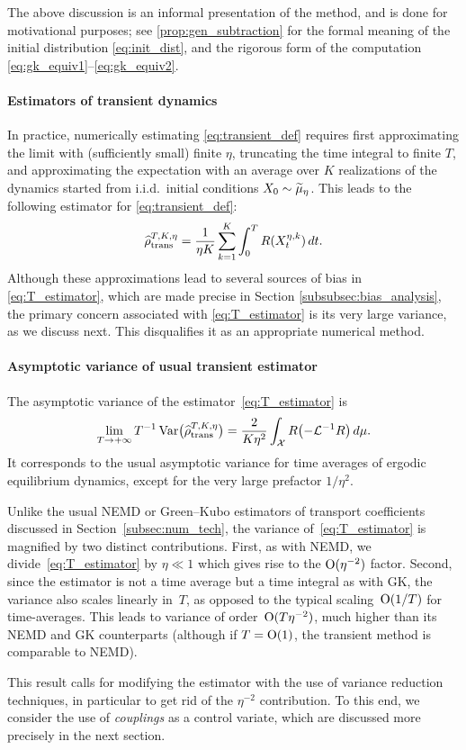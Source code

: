 The above discussion is an informal presentation of the method, and is done for motivational purposes; see \cref{prop:gen_subtraction} for the formal meaning of the initial distribution \eqref{eq:init_dist}, and the rigorous form of the computation \eqref{eq:gk_equiv1}--\eqref{eq:gk_equiv2}.  

\paragraph{Estimators of transient dynamics} In practice, numerically estimating \eqref{eq:transient_def} requires first approximating the limit with (sufficiently small) finite $\eta$, truncating the time integral to finite $T$, and approximating the expectation with an average over $K$ realizations of the dynamics started from i.i.d.\ initial conditions $X_0\sim\widetilde{\mu}_\eta$. This leads to the following estimator for \eqref{eq:transient_def}:
%
\begin{equation}
	\widehat{\rho}^{T,K,\eta}_{\rm trans} = \frac{1}{\eta K}\sum_{k=1}^K \int_0^T R(X_t^{\eta,k}) \, dt.	
	\label{eq:T_estimator}
\end{equation}
%
Although these approximations lead to several sources of bias in \eqref{eq:T_estimator}, which are made precise in Section \ref{subsubsec:bias_analysis}, the primary concern associated with \eqref{eq:T_estimator} is its very large variance, as we discuss next. This disqualifies it as an appropriate numerical method.

\paragraph{Asymptotic variance of usual transient estimator} The asymptotic variance of the estimator~\eqref{eq:T_estimator} is
%
\begin{equation}
	\lim_{T\to+\infty} T^{-1}\Var\bigl(\Test\bigr) = \frac{2}{K\eta^2}\int_\mathcal{X} R\paren*{-\L^{-1} R} \, d\mu.
	\label{eq:asym_var_transient}
\end{equation}
%
It corresponds to the usual asymptotic variance for time averages of ergodic equilibrium dynamics, except for the very large prefactor $1/\eta^2$. 

Unlike the usual NEMD or Green--Kubo estimators of transport coefficients discussed in Section~\ref{subsec:num_tech}, the variance of~\eqref{eq:T_estimator} is magnified by two distinct contributions. First, as with NEMD, we divide~\eqref{eq:T_estimator} by $\eta\ll 1$ which gives rise to the $\mathrm{O}(\eta^{-2})$ factor. Second, since the estimator is not a time average but a time integral as with GK, the variance also scales linearly in~$T$, as opposed to the typical scaling~$\mathrm{O}(1/T)$ for time-averages. This leads to variance of order~$\mathrm{O}(T\eta^{-2})$, much higher than its NEMD and GK counterparts (although if $T=\mathrm{O}(1)$, the transient method is comparable to NEMD).

This result calls for modifying the estimator with the use of variance reduction techniques, in particular to get rid of the $\eta^{-2}$ contribution. To this end, we consider the use of \emph{couplings} as a control variate, which are discussed more precisely in the next section.